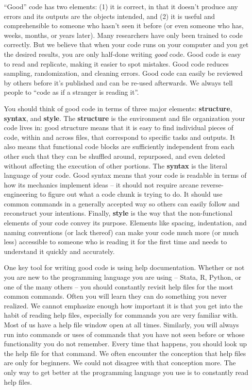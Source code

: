``Good'' code has two elements:
(1) it is correct, in that it doesn't produce any errors
and its outputs are the objects intended,
and (2) it is useful and comprehensible
to someone who hasn't seen it before
(or even someone who has, weeks, months, or years later).
Many researchers have only been trained to code correctly.
But we believe that when your code runs on your computer
and you get the desired results,
you are only half-done writing \textit{good} code.
Good code is easy to read and replicate,
making it easier to spot mistakes.
Good code reduces sampling, randomization, and cleaning errors.
Good code can easily be reviewed by others
before it's published and can be re-used afterwards.
We always tell people to ``code as if a stranger is reading it''.

You should think of good code in terms of three major elements:
\textbf{structure}, \textbf{syntax}, and \textbf{style}.
The \textbf{structure} is the environment
and file organization your code lives in:
good structure means that it is easy to find individual pieces of code,
within and across files,
that correspond to specific tasks and outputs.
It also means that functional code blocks
are sufficiently independent from each other
such that they can be shuffled around, repurposed,
and even deleted without affecting the execution of other portions.
The \textbf{syntax} is the literal language of your code.
Good syntax means that your code is readable
in terms of how its mechanics implement ideas --
it should not require arcane reverse-engineering
to figure out what a code chunk is trying to do.
It should use common commands in a generally accepted way
so others can easily follow and reconstruct your intentions.
Finally, \textbf{style} is the way
that the non-functional elements of your code convey its purpose.
Elements like spacing, indentation,
and naming conventions (or lack thereof)
can make your code much more
(or much less) accessible to someone
who is reading it for the first time
and needs to understand it quickly and accurately.

One key tool for writing good code is using help documentation.
Whether or not you are new to the programming language you are using
-- Stata, R, Python, or one of the many others --
you should constantly revisit help files for the most common commands.
Often you will learn they can do something you never realized.
We cannot emphasize enough how important it is
that you get into the habit of reading help files,
especially for commands you are very familiar with.
Most of us have a help file window open at all times.
Similarly, you will always run into commands or uses of commands that
you have not seen before or whose functionality you do not remember.
Every time that happens,
you should look up the help file for that command.
We often encounter the conception that help files are only for beginners.
We could not disagree with that conception more.
The only way to get better at the programming language you use
is to constantly read help files.

